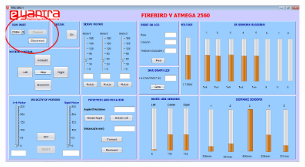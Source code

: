 \documentclass{article}
\begin{document}
\begin{enumerate}
		\begin{figure}[h]
			\begin{center}
				\includegraphics[scale=0.4]{disconnect.png}
			\end{center}
		\end{figure}  
	\end{enumerate}
		
\end{document}

